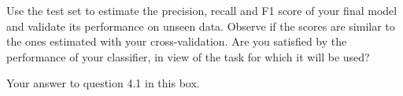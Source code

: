 
\begin{question}{4.1}
Use the test set to estimate the precision, recall and F1 score of your final model and validate its performance on unseen data.
Observe if the scores are similar to the ones estimated with your cross-validation. Are you satisfied by the performance of your classifier, in view of the task for which it will be used? 
\end{question}

\begin{answer}{10} 
    Your answer to question 4.1 in this box.\\
\end{answer}


